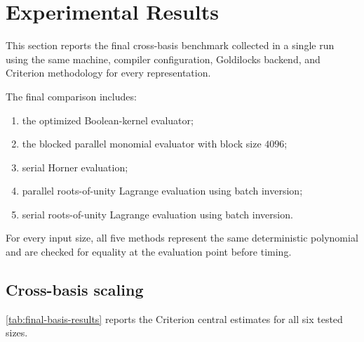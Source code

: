 \section{Experimental Results}
\label{sec:results}

This section reports the final cross-basis benchmark collected in a single
run using the same machine, compiler configuration, Goldilocks backend, and
Criterion methodology for every representation.

The final comparison includes:

\begin{enumerate}
    \item the optimized Boolean-kernel evaluator;
    \item the blocked parallel monomial evaluator with block size \(4096\);
    \item serial Horner evaluation;
    \item parallel roots-of-unity Lagrange evaluation using batch inversion;
    \item serial roots-of-unity Lagrange evaluation using batch inversion.
\end{enumerate}

For every input size, all five methods represent the same deterministic
polynomial and are checked for equality at the evaluation point before
timing.

\subsection{Cross-basis scaling}

\cref{tab:final-basis-results} reports the Criterion central estimates for
all six tested sizes.

